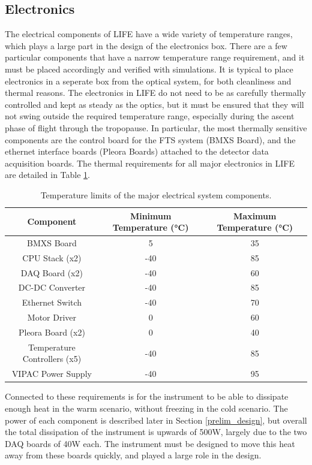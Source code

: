 \subsection{Electronics}\label{electronics_reqs}
The electrical components of LIFE have a wide variety of temperature ranges, which plays a large part in the design of the electronics box. There are a few particular components that have a narrow temperature range requirement, and it must be placed accordingly and verified with simulations. It is typical to place electronics in a seperate box from the optical system, for both cleanliness and thermal reasons. The electronics in LIFE do not need to be as carefully thermally controlled and kept as steady as the optics, but it must be ensured that they will not swing outside the required temperature range, especially during the ascent phase of flight through the tropopause. In particular, the most  thermally sensitive components are the control board for the FTS system (BMXS Board), and the ethernet interface boards (Pleora Boards) attached to the detector data acquisition boards. The thermal requirements for all major electronics in LIFE are detailed in Table \ref{therm_req_table}. 

\begin{table}[h]
\begin{center}
\begin{tabular}{ |c|c|c| }
 \hline
 \rowcolor{lightgray}
 Component & Minimum Temperature (°C) & Maximum Temperature (°C)\\
  \hline
  \hline
 BMXS Board  & 5 & 35 \\
 \hline
 CPU Stack (x2)  & -40 & 85 \\
 \hline
 DAQ Board (x2)  & -40 & 60 \\
 \hline
 DC-DC Converter & -40 & 85 \\
 \hline
 Ethernet Switch & -40 & 70 \\
 \hline
 Motor Driver & 0 & 60 \\
 \hline
 Pleora Board (x2)  & 0 & 40 \\
 \hline
 Temperature Controllers (x5) & -40 & 85 \\
 \hline
 VIPAC Power Supply & -40 & 95 \\
 \hline
\end{tabular}
\end{center}
\caption{Temperature limits of the major electrical system components.}
 \label{therm_req_table}
\end{table}

Connected to these requirements is for the instrument to be able to dissipate enough heat in the warm scenario, without freezing in the cold scenario. The power of each component is described later in Section \ref{prelim_design}, but overall the total dissipation of the instrument is upwards of 500W, largely due to the two DAQ boards of 40W each. The instrument must be designed to move this heat away from these boards quickly, and played a large role in the design.


